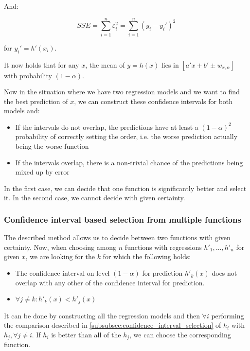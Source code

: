 And:

\[SSE = \sum_{i = 1}^{n} \varepsilon_i^2  =  \sum_{i = 1}^{n} (y_i - y_i')^2 \]

for \(y_i' = h'(x_i)\).

It now holds that for any $x$, the mean of $y = h(x)$ lies in $[a'x + b' \pm w_{x, \alpha}]$ with probability $(1-\alpha)$.

Now in the situation where we have two regression models and we want to find the best prediction of $x$, we can construct these confidence intervals for both models and:

\begin{itemize}
	\item If the intervals do not overlap, the predictions have at least a $(1 - \alpha)^2$ probability of correctly setting the order, i.e. the worse prediction actually being the worse function
	\item If the intervals overlap, there is a non-trivial chance of the predictions being mixed up by error
\end{itemize}

In the first case, we can decide that one function is significantly better and select it. In the second case, we cannot decide with given certainty.

\subsubsection{Confidence interval based selection from multiple functions}

The described method allows us to decide between two functions with given certainty. Now, when choosing among $n$ functions with regressions $h'_1, \dots, h'_n$ for given $x$, we are looking for the $k$ for which the following holds:

\begin{itemize}
	\item The confidence interval on level $(1-\alpha)$ for prediction $h'_k(x)$ does not overlap with any other of the confidence interval for prediction.
	\item $\forall j \ne k: h'_k(x) < h'_j(x)$
\end{itemize}

It can be done by constructing all the regression models and then $\forall i$ performing the comparison described in \ref{subsubsec:confidence_interval_selection} of $h_i$ with $h_j, \forall j \ne i$. If $h_i$ is better than all of the $h_j$, we can choose the corresponding function.

